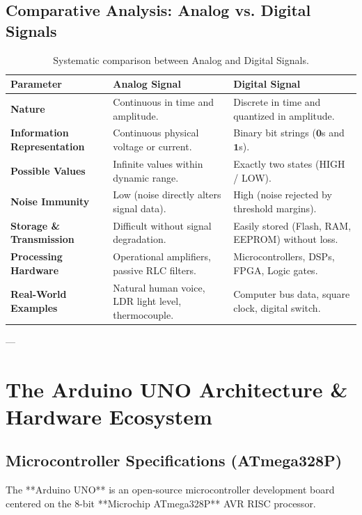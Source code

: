 \subsection{Comparative Analysis: Analog vs. Digital Signals}
\begin{table}[htbp]
\centering
\small
\begin{tabularx}{\textwidth}{lXX}
\toprule
\textbf{Parameter} & \textbf{Analog Signal} & \textbf{Digital Signal} \\
\midrule
\textbf{Nature} & Continuous in time and amplitude. & Discrete in time and quantized in amplitude. \\
\textbf{Information Representation} & Continuous physical voltage or current. & Binary bit strings ($\mathbf{0}$s and $\mathbf{1}$s). \\
\textbf{Possible Values} & Infinite values within dynamic range. & Exactly two states (HIGH / LOW). \\
\textbf{Noise Immunity} & Low (noise directly alters signal data). & High (noise rejected by threshold margins). \\
\textbf{Storage \& Transmission} & Difficult without signal degradation. & Easily stored (Flash, RAM, EEPROM) without loss. \\
\textbf{Processing Hardware} & Operational amplifiers, passive RLC filters. & Microcontrollers, DSPs, FPGA, Logic gates. \\
\textbf{Real-World Examples} & Natural human voice, LDR light level, thermocouple. & Computer bus data, square clock, digital switch. \\
\bottomrule
\end{tabularx}
\caption{Systematic comparison between Analog and Digital Signals.}
\label{tab:analog-digital-comp}
\end{table}

---

\section{The Arduino UNO Architecture \& Hardware Ecosystem}

\subsection{Microcontroller Specifications (ATmega328P)}
The **Arduino UNO** is an open-source microcontroller development board centered on the 8-bit **Microchip ATmega328P** AVR RISC processor.


